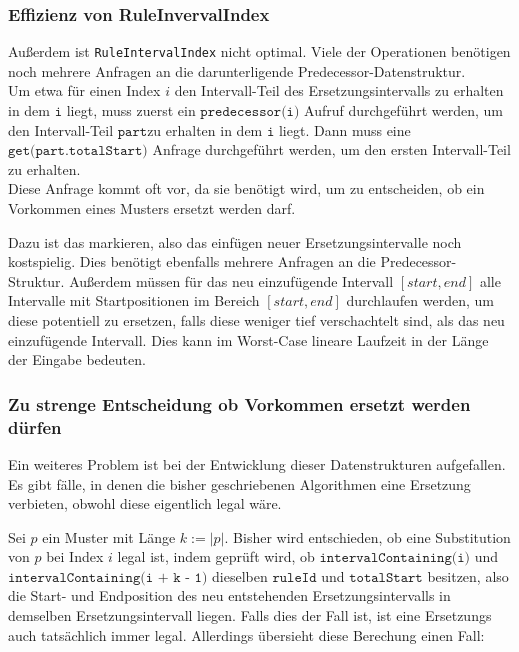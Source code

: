 \subsubsection{Effizienz von RuleInvervalIndex}

Außerdem ist \texttt{RuleIntervalIndex} nicht optimal. Viele der Operationen benötigen noch mehrere Anfragen an die darunterligende Predecessor-Datenstruktur.\\
Um etwa für einen Index $i$ den Intervall-Teil des Ersetzungsintervalls zu erhalten in dem $\texttt{i}$ liegt, muss zuerst ein $\texttt{predecessor(i)}$ Aufruf durchgeführt werden, um den Intervall-Teil $\texttt{part}$zu erhalten in dem $\texttt{i}$ liegt. Dann muss eine $\texttt{get(part.totalStart)}$ Anfrage durchgeführt werden, um den ersten Intervall-Teil zu erhalten.\\
Diese Anfrage kommt oft vor, da sie benötigt wird, um zu entscheiden, ob ein Vorkommen eines Musters ersetzt werden darf.

Dazu ist das markieren, also das einfügen neuer Ersetzungsintervalle noch kostspielig. Dies benötigt ebenfalls mehrere Anfragen an die Predecessor-Struktur. Außerdem müssen für das neu einzufügende Intervall $[start, end]$ alle Intervalle mit Startpositionen im Bereich $[start, end]$ durchlaufen werden, um diese potentiell zu ersetzen, falls diese weniger tief verschachtelt sind, als das neu einzufügende Intervall. Dies kann im Worst-Case lineare Laufzeit in der Länge der Eingabe bedeuten.

\subsubsection{Zu strenge Entscheidung ob Vorkommen ersetzt werden dürfen}
\label{strictdecision}
Ein weiteres Problem ist bei der Entwicklung dieser Datenstrukturen aufgefallen. Es gibt fälle, in denen die bisher geschriebenen Algorithmen eine Ersetzung verbieten, obwohl diese eigentlich legal wäre.

Sei $p$ ein Muster mit Länge $k := |p|$. Bisher wird entschieden, ob eine Substitution von $p$ bei Index $i$ legal ist, indem geprüft wird, ob $\texttt{intervalContaining(i)}$ und $\texttt{intervalContaining(i + k - 1)}$ dieselben $\texttt{ruleId}$ und $\texttt{totalStart}$ besitzen, also die Start- und Endposition des neu entstehenden Ersetzungsintervalls in demselben Ersetzungsintervall liegen. Falls dies der Fall ist, ist eine Ersetzungs auch tatsächlich immer legal. Allerdings übersieht diese Berechung einen Fall:

